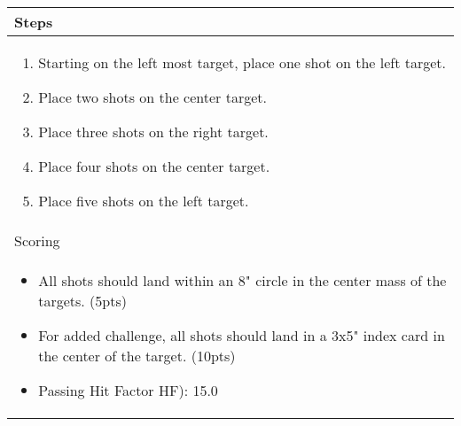 \documentclass[../Cover.tex]{subfiles}
\begin{document}
	\begin{tabular}{ | p{} |}
		\hline
		\rowcolor[HTML]{C0C0C0}Steps\\ 
		\hline
		\tiny \begin{enumerate}[topsep=0pt, partopsep=0pt]
			\item Starting on the left most target, place one shot on the left target.
			\item Place two shots on the center target.
			\item Place three shots on the right target.
			\item Place four shots on the center target.
			\item Place five shots on the left target.
		\end{enumerate}		
		\\ [0.25\textheight]
		\hline
		\rowcolor[HTML]{C0C0C0}Scoring \\
		\hline
		\tiny \begin{itemize}[topsep=0pt, partopsep=0pt]
			\item All shots should land within an 8" circle in the center mass of the targets. (5pts)
			\item For added challenge, all shots should land in a 3x5" index card in the center of the target. (10pts)
			\item Passing Hit Factor HF): 15.0
		\end{itemize}		
		\\ [0.25\textheight]
		\hline
	\end{tabular}
\end{document}
